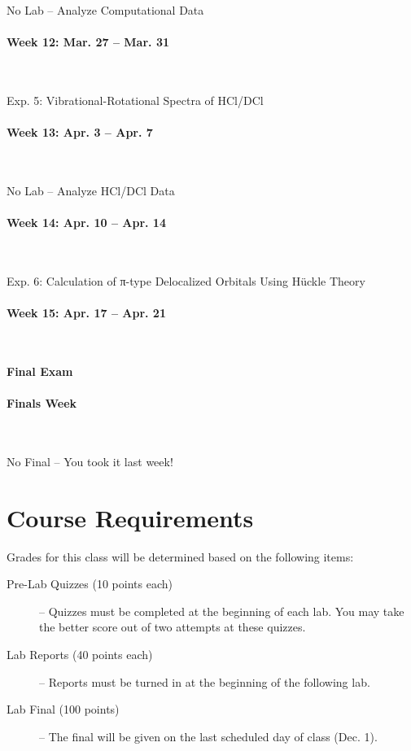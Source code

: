 \documentclass[12pt, letterpaper]{article}
\begin{document}
No Lab -- Analyze Computational Data

\paragraph{Week 12: Mar. 27 -- Mar. 31}~

Exp. 5: Vibrational-Rotational Spectra of HCl/DCl

\paragraph{Week 13: Apr. 3 -- Apr. 7}~

No Lab -- Analyze HCl/DCl Data

\paragraph{Week 14: Apr. 10 -- Apr. 14}~

Exp. 6: Calculation of π-type Delocalized Orbitals Using Hückle Theory

\paragraph{Week 15: Apr. 17 -- Apr. 21}~

\textbf{Final Exam}

\paragraph{Finals Week}~

No Final -- You took it last week!

\section*{Course Requirements}
Grades for this class will be determined based on the following items:

\begin{description}
	\item[Pre-Lab Quizzes (10 points each)] -- Quizzes must be completed at the beginning of each lab. You may take the better score out of two attempts at these quizzes.
	\item[Lab Reports (40 points each)] -- Reports must be turned in at the beginning of the following lab.
	\item[Lab Final (100 points)] -- The final will be given on the last scheduled day of class (Dec. 1).
\end{description}
\end{document}
